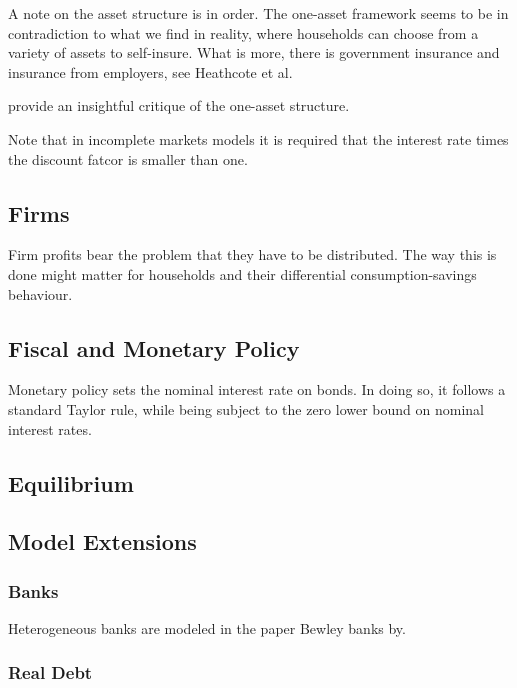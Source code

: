 \documentclass[12pt]{article} %
\numberwithin{equation}{section} %
\begin{document}
A note on the asset structure is in order. The one-asset framework seems to be in contradiction to what we find in reality, where households can choose from a variety of assets to self-insure. What is more, there is government insurance and insurance from employers, see Heathcote et al.

\textcite{kaplan2018} provide an insightful critique of the one-asset structure. 

Note that in incomplete markets models it is required that the interest rate times the discount fatcor is smaller than one.

\subsection{Firms}
\label{sec:model-firms}

Firm profits bear the problem that they have to be distributed. The way this is done might matter for households and their differential consumption-savings behaviour. 

\subsection{Fiscal and Monetary Policy}
\label{sec:model-policy}

Monetary policy sets the nominal interest rate on bonds. In doing so, it follows a standard Taylor rule, while being subject to the zero lower bound on nominal interest rates. 

\subsection{Equilibrium}
\label{sec:model-eq}

\subsection{Model Extensions}
\label{sec:model-extensions}

\subsubsection{Banks}
\label{sec:model-extensions-banks}

Heterogeneous banks are modeled in the paper Bewley banks by.

\subsubsection{Real Debt}
\label{sec:model-extensions-realdebt}
\end{document}

